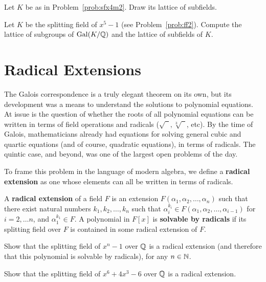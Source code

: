 \begin{problem}
    Let $K$ be as in Problem~\ref{prob:sfx4m2}. Draw its lattice of subfields.
\end{problem}

\begin{problem}
    Let $K$ be the splitting field of $x^5-1$ (see Problem~\ref{prob:ff2}). Compute the lattice of subgroups of $\operatorname{Gal}(K/\mathbb{Q})$ and the lattice of subfields of $K$.
\end{problem}

\section{Radical Extensions}

The Galois correspondence is a truly elegant theorem on its own, but its development was a means to understand the solutions to polynomial equations. At issue is the question of whether the roots of all polynomial equations can be written in terms of field operations and radicals ($\sqrt{\phantom{2}}, \sqrt[3]{\phantom{2}}$, etc). By the time of Galois, mathematicians already had equations for solving general cubic and quartic equations (and of course, quadratic equations), in terms of radicals. The quintic case, and beyond, was one of the largest open problems of the day.\medskip

To frame this problem in the language of modern algebra, we define a \textbf{radical extension} as one whose elements can all be written in terms of radicals.

\begin{definition}
    A \textbf{radical extension} of a field $F$ is an extension $F(\alpha_1,\alpha_2, \ldots, \alpha_n)$ such that there exist natural numbers $k_1,k_2,\ldots,k_n$ such that $\alpha_{i}^{k_i} \in F(\alpha_1,\alpha_2, \ldots, \alpha_{i-1})$ for $i = 2,\ldots n$, and $\alpha_1^{k_1} \in F$. A polynomial in $F[x]$ is \textbf{solvable by radicals} if its splitting field over $F$ is contained in some radical extension of $F$.
\end{definition}

\begin{problem}
Show that the splitting field of $x^n-1$ over $\mathbb{Q}$ is a radical extension (and therefore that this polynomial is solvable by radicals), for any $n\in \mathbb{N}$.
\end{problem}

\begin{problem}
Show that the splitting field of $x^6+4x^3-6$ over $\mathbb{Q}$ is a radical extension.
\end{problem}

